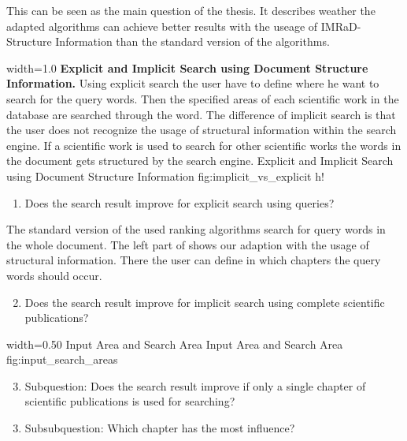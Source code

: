 This can be seen as the main question of the thesis. It describes weather the adapted algorithms can achieve better results with the useage of IMRaD-Structure Information than the standard version of the algorithms.

      {width=1.0\textwidth}
      {\textbf{Explicit and Implicit Search using Document Structure Information.} Using explicit search the user have to define where he want to search for the query words. Then the specified areas of each scientific work in the database are searched through the word. The difference of implicit search is that the user does not recognize the usage of structural information within the search engine. If a scientific work is used to search for other scientific works the words in the document gets structured by the search engine.}
      {Explicit and Implicit Search using Document Structure Information}
      {fig:implicit_vs_explicit}
      {h!}

\begin{enumerate}[label=1.\arabic*]
  \item Does the search result improve for explicit search using queries?
\end{enumerate}

The standard version of the used ranking algorithms search for query words in the whole document. The left part of  shows our adaption with the usage of structural information. There the user can define in which chapters the query words should occur.

\begin{enumerate}[label=1.\arabic*]
  \setcounter{enumi}{1}
  \item Does the search result improve for implicit search using complete scientific publications?
\end{enumerate}

      {width=0.50\textwidth}
      {Input Area and Search Area}
      {Input Area and Search Area}
      {fig:input_search_areas}

\begin{enumerate}
  \setcounter{enumi}{2}
    \item Subquestion: Does the search result improve if only a single chapter of scientific publications is used for searching?
\end{enumerate}

\begin{enumerate}
  \setcounter{enumi}{2}
    \item Subsubquestion: Which chapter has the most influence?
\end{enumerate}
